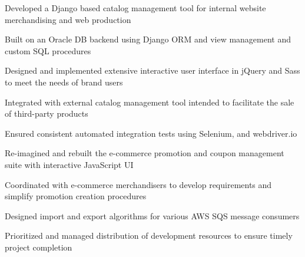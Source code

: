 \documentclass[11pt, a4paper]{awesome-cv}
\begin{document}
\begin{cventries}
{\begin{cvitems}
\begin{cvitemssub}
                    \end{cvitemssub}
                \item{Developed a Django based catalog management tool for internal website merchandising and web production}
                    \begin{cvitemssub}
                        \item{Built on an Oracle DB backend using Django ORM and view management and custom SQL procedures}
                        \item{Designed and implemented extensive interactive user interface in jQuery and Sass to meet the needs of brand users}
                        \item{Integrated with external catalog management tool intended to facilitate the sale of third-party products}
                        \item{Ensured consistent automated integration tests using Selenium, and webdriver.io}
                    \end{cvitemssub}
                \item{Re-imagined and rebuilt the e-commerce promotion and coupon management suite with interactive JavaScript UI}
                    \begin{cvitemssub}
                        \item{Coordinated with e-commerce merchandisers to develop requirements and simplify promotion creation procedures}
                        \item{Designed import and export algorithms for various AWS SQS message consumers}
                        \item{Prioritized and managed distribution of development resources to ensure timely project completion}
                    \end{cvitemssub}
          \end{cvitems}
    }
 

\end{cventries}
\end{document}
